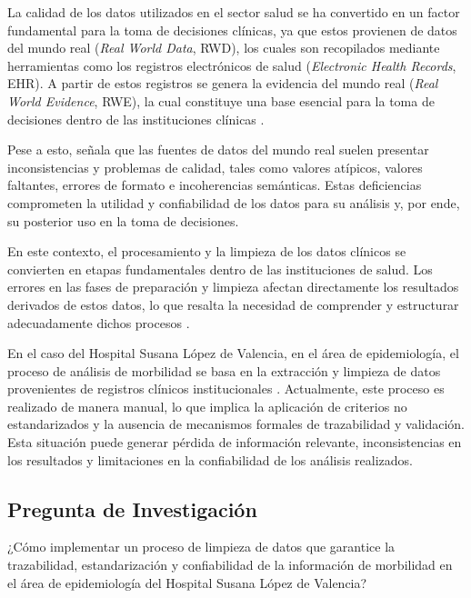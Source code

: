 \documentclass[12pt, letterpaper, oneside]{article}
\begin{document}
La calidad de los datos utilizados en el sector salud se ha convertido en un factor fundamental para la toma de decisiones clínicas, ya que estos provienen de datos del mundo real (\textit{Real World Data}, RWD), los cuales son recopilados mediante herramientas como los registros electrónicos de salud (\textit{Electronic Health Records}, EHR). A partir de estos registros se genera la evidencia del mundo real (\textit{Real World Evidence}, RWE), la cual constituye una base esencial para la toma de decisiones dentro de las instituciones clínicas \parencite{lighterness_data_2024}.

Pese a esto, \textcite{ben_scalable_2024} señala que las fuentes de datos del mundo real suelen presentar inconsistencias y problemas de calidad, tales como valores atípicos, valores faltantes, errores de formato e incoherencias semánticas. Estas deficiencias comprometen la utilidad y confiabilidad de los datos para su análisis y, por ende, su posterior uso en la toma de decisiones.

En este contexto, el procesamiento y la limpieza de los datos clínicos se convierten en etapas fundamentales dentro de las instituciones de salud. Los errores en las fases de preparación y limpieza afectan directamente los resultados derivados de estos datos, lo que resalta la necesidad de comprender y estructurar adecuadamente dichos procesos \parencite{albu_challenges_2025}.

En el caso del Hospital Susana López de Valencia, en el área de epidemiología, el proceso de análisis de morbilidad se basa en la extracción y limpieza de datos provenientes de registros clínicos institucionales \parencite{Procedimiento_Morbilidad_HSLV}. Actualmente, este proceso es realizado de manera manual, lo que implica la aplicación de criterios no estandarizados y la ausencia de mecanismos formales de trazabilidad y validación. Esta situación puede generar pérdida de información relevante, inconsistencias en los resultados y limitaciones en la confiabilidad de los análisis realizados.

\subsection{Pregunta de Investigación}

¿Cómo implementar un proceso de limpieza de datos que garantice la trazabilidad, estandarización y confiabilidad de la información de morbilidad en el área de epidemiología del Hospital Susana López de Valencia?
\end{document}
